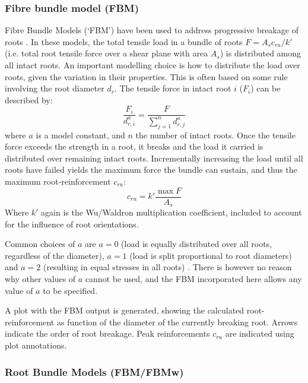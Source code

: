 \documentclass[a4 paper, 11  pt]{article}
\begin{document}
\subsubsection{Fibre bundle model (FBM)}
\label{sec:fbm}
Fibre Bundle Models (`FBM') have been used to address progressive breakage of roots \citep{pollen2005}. In these models, the total tensile load in a bundle of roots $F = A_s c_{ru}/k'$ (i.e. total root tensile force over a shear plane with area $A_s$) is distributed among all intact roots. An important modelling choice is how to distribute the load over roots, given the variation in their properties. This is often based on some rule involving the root diameter $d_r$. The tensile force in intact root $i$ ($F_i$) can be described by:
\begin{equation}
	\frac{F_i}{d_{r,i}^a} = \frac{F}{\sum\limits_{j=1}^{n} d_{r,j}^a}
	\label{eq:fbmloadsharing}
\end{equation}
where $a$ is a model constant, and $n$ the number of intact roots. Once the tensile force exceeds the strength in a root, it breaks and the load it carried is distributed over remaining intact roots. Incrementally increasing the load until all roots have failed yields the maximum force the bundle can sustain, and thus the maximum root-reinforcement $c_{ru}$:
\begin{equation}
	c_{ru} = k' \frac{\max F}{A_s}
\end{equation}
Where $k'$ again is the Wu/Waldron multiplication coefficient, included to account for the influence of root orientations. 

Common choices of $a$ are $a=0$ (load is equally distributed over all roots, regardless of the diameter), $a=1$ (load is split proportional to root diameters) and $a=2$ (resulting in equal stresses in all roots) \citep[see for example][]{comino2010,thomas2010,mao2012}. There is however no reason why other values of $a$ cannot be used, and the FBM incorporated here allows any value of $a$ to be specified.

A plot with the FBM output is generated, showing the calculated root-reinforcement as function of the diameter of the currently breaking root. Arrows indicate the order of root breakage. Peak reinforcements $c_{ru}$ are indicated using plot annotations.

\subsubsection{Root Bundle Models (FBM/FBMw)}
\label{sec:rbm}
\end{document}
